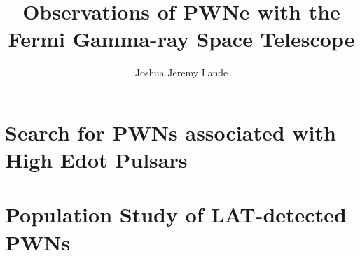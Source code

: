 \documentclass[12pt]{report}
\title{Observations of PWNe with the Fermi Gamma-ray Space Telescope}
\author{Joshua Jeremy Lande}
\begin{document}
\listoftodos
\newpage
 


\beforepreface


\afterpreface




\acresetall











\chapter{Search for \acp{PWN} associated with High Edot Pulsars}

\chapter{Population Study of LAT-detected \acp{PWN}}


\appendix

%
%
%





\end{document}

